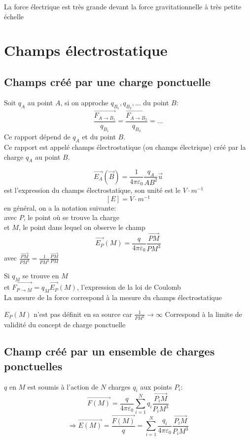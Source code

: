 \documentclass[../main.tex]{subfile}
\begin{document}
La force électrique est très grande devant la force gravitationnelle à très petite échelle

\section{Champs électrostatique}
\subsection{Champs créé par une charge ponctuelle}
Soit $q_A$ au point $A$, si on approche $q_{B_1}, q_{B_2}, ...$ du point $B$:
$$\frac{\vec{F_{A \to B_1}}}{q_{B_1}} = \frac{\vec{F_{A \to B_2}}}{q_{B_2}} = ...$$
Ce rapport dépend de $q_A$ et du point $B$.\\
Ce rapport est appelé champs électrostatique (ou champs électrique) créé par la charge $q_A$ au point $B$.

$$\vec{E_A}(\vec{B}) = \frac{1}{4 \pi \varepsilon_0} \frac{q_A}{AB^2} \vec{u}$$
est l'expression du champs électrostatique, son unité est le $V \cdot m^{-1}$
$$[E] = V \cdot m^{-1}$$
en général, on a la notation suivante:\\
avec $P$, le point où se trouve la charge\\
et $M$, le point dans lequel on observe le champ
$$\vec{E_P}(M) = \frac{q}{4\pi \varepsilon_0} \frac{\vec{PM}}{PM^3}$$
avec $\frac{\vec{PM}}{PM^3} = \frac{1}{PM^2} \frac{\vec{PM}}{PM}$\\

\begin{rema}
	Si $q_M$ se trouve en $M$\\
	et $\vec{F_{P \to M}} = q_M \vec{E_P}(M)$, l'expression de la loi de Coulomb\\
	La mesure de la force correspond à la mesure du champs électrostatique
\end{rema}

\begin{rema}
	$E_P(M)$ n'est pas définit en sa source car $\frac{1}{PM^2} \to \infty$
	Correspond à la limite de validité du concept de charge ponctuelle
\end{rema}


\subsection{Champ créé par un ensemble de charges ponctuelles}

$q$ en $M$ est soumis à l'action de $N$ charges $q_i$ aux points $P_i$:
$$\vec{F(M)} = \frac{q}{4\pi\varepsilon_0} \sum\limits_{i=1}^N q_i \frac{\vec{P_iM}}{P_iM^3}$$
$$\Rightarrow \vec{E(M)} = \frac{\vec{F(M)}}{q} = \sum\limits_{i=1}^N \frac{q_i}{4\pi\varepsilon_0} \frac{\vec{P_iM}}{P_iM^3}$$
\end{document}
